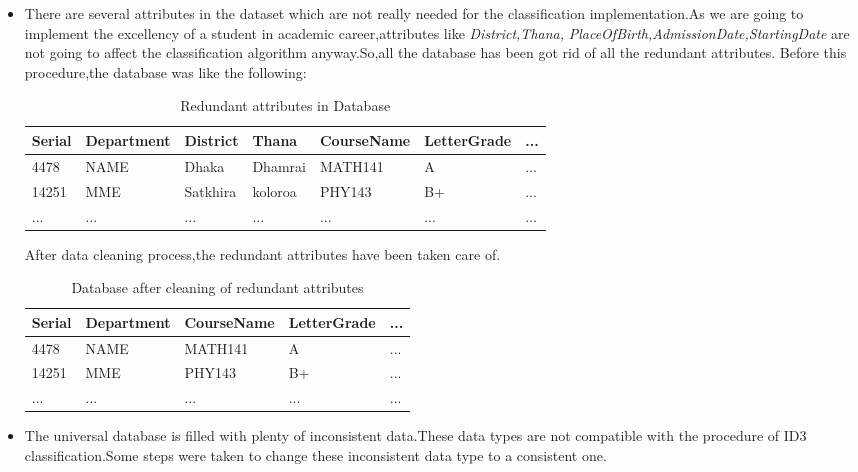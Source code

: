 \documentclass[a4paper,12pt]{book}
\begin{document}
\begin{itemize}
\begin {table}[H]
\end{table}
\item There are several attributes in the dataset which are not really needed for the classification implementation.As we are going to implement the excellency of a student in academic career,attributes like \textit{District,Thana,} \textit{PlaceOfBirth,AdmissionDate,StartingDate} are not going to affect the classification algorithm anyway.So,all the database has been got rid of all the redundant attributes.
Before this procedure,the database was like the following:
\begin {table}[H]
\caption {Redundant attributes in Database} \label{tab:title}
\begin{center}
\begin{tabular}{ | m{1cm} | m{2cm}| m{1.5cm}| m{1.5cm} | m{2cm} | m{2cm} |  m{0.5cm} | } 
\hline
Serial & Department & District & Thana & CourseName & LetterGrade & ... \\ 
\hline
4478 & NAME & Dhaka & Dhamrai & MATH141 & A & ... \\ 
\hline
14251 & MME & Satkhira & koloroa & PHY143 & B+ & ... \\ 
\hline
... & ... & ... & ... & ... & ... & ... \\ 
\hline
\end{tabular}
\end{center}
\end{table}
After data cleaning process,the redundant attributes have been taken care of.
\begin {table}[H]
\caption {Database after cleaning of redundant attributes} \label{tab:title}
\begin{center}
\begin{tabular}{ | m{1cm} |  m{2cm} | m{2cm} | m{2cm} |  m{0.5cm} | } 
\hline
Serial & Department &  CourseName & LetterGrade & ... \\ 
\hline
4478 & NAME & MATH141 & A & ... \\ 
\hline
14251 & MME & PHY143 & B+ & ... \\ 
\hline
... & ... & ... & ... & ... \\ 
\hline
\end{tabular}
\end{center}
\end{table}
\item The universal database is filled with plenty of inconsistent data.These data types are not compatible with the procedure of ID3 classification.Some steps were taken to change these inconsistent data type to a consistent one. \newline

\end{itemize}
\end{document}
